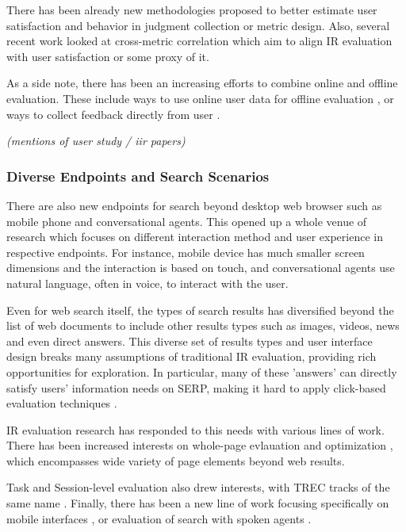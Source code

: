 \documentclass[openany]{now} %
\newcommand{\authornote}[3]{\marginpar{\tiny\color{#1}#2: #3}{\color{#1}{$\star$}}}
\newcommand{\emine}[1]{\authornote{green}{Emine}{#1}}
\newcommand{\note}[1]{\textit{(#1)}}
\begin{document}
There has been already new methodologies proposed to better estimate user satisfaction and behavior in judgment collection \cite{VermaY16, VermaYC16} or metric design\cite{YilmazSCR10, CarteretteKY11, ChapelleMZG09}. Also, several recent work looked at cross-metric correlation \cite{Al-Maskari2007} \cite{radl:comp10} which aim to align IR evaluation with user satisfaction or some proxy of it.

As a side note, there has been an increasing\emine{} efforts to combine online and offline evaluation. These include ways to use online user data for offline evaluation \cite{Li:2015} \cite{li2010contextual} \cite{chuklin2015click}, or ways to collect feedback directly from user \cite{Kim2016}. 

\note{mentions of user study / iir papers}

\subsubsection{Diverse Endpoints and Search Scenarios}

There are also new endpoints for search beyond desktop web browser such as mobile phone and conversational agents. This opened up a whole venue of research which focuses on different interaction method and user experience in respective endpoints. For instance, mobile device has much smaller screen dimensions and the interaction is based on touch, and conversational agents use natural language, often in voice, to interact with the user.

Even for web search itself, the types of search results has diversified beyond the list of web documents to include other results types such as images, videos, news and even direct answers. This diverse set of results types and user interface design breaks many assumptions of traditional IR evaluation, providing rich opportunities for exploration. In particular, many of these 'answers' can directly satisfy users' information needs on SERP, making it hard to apply click-based evaluation techniques \cite{Li2009GA} \cite{diriye2012leaving}.

IR evaluation research has responded to this needs with various lines of work. There has been increased\emine{} interests on whole-page evlauation and optimization \cite{Zhou:2012}, which encompasses wide variety of page elements beyond web results. %

Task and Session-level evaluation \cite{KanoulasCCS11, CarteretteKHC14} also drew interests, with TREC tracks of the same name \cite{}. Finally, there has been a new line of work focusing specifically on mobile interfaces \cite{VermaYC16}, or evaluation of search with spoken agents \cite{Kiseleva:2016}.
\end{document}
